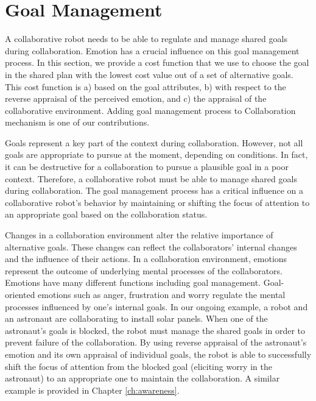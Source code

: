 \documentclass[12pt]{report}
\begin{document}
\section{Goal Management}
\label{sec:goal-management}

A collaborative robot needs to be able to regulate and manage shared goals
during collaboration. Emotion has a crucial influence on this goal management
process. In this section, we provide a cost function that we use to choose the
goal in the shared plan with the lowest cost value out of a set of alternative
goals. This cost function is a) based on the goal attributes, b) with respect to
the reverse appraisal of the perceived emotion, and c) the appraisal of the
collaborative environment. Adding goal management process to Collaboration
mechanism is one of our contributions.

Goals represent a key part of the context during collaboration. However, not all
goals are appropriate to pursue at the moment, depending on conditions. In fact,
it can be destructive for a collaboration to pursue a plausible goal in a poor
context. Therefore, a collaborative robot must be able to manage shared goals
during collaboration. The goal management process has a critical influence on a
collaborative robot's behavior by maintaining or shifting the focus of attention
to an appropriate goal based on the collaboration status.

Changes in a collaboration environment alter the relative importance of
alternative goals. These changes can reflect the collaborators' internal changes
and the influence of their actions. In a collaboration environment, emotions
represent the outcome of underlying mental processes of the collaborators.
Emotions have many different functions
\cite{scheutz:architectural-action-selection} including goal management.
Goal-oriented emotions such as anger, frustration and worry regulate the mental
processes influenced by one's internal goals. In our ongoing example, a robot
and an astronaut are collaborating to install solar panels. When one of the
astronaut's goals is blocked, the robot must manage the shared goals in order to
prevent failure of the collaboration. By using reverse appraisal
\cite{gratch:reverse-appraisal} of the astronaut's emotion and its own appraisal
of individual goals, the robot is able to successfully shift the focus of
attention from the blocked goal (eliciting worry in the astronaut) to an
appropriate one to maintain the collaboration. A similar example is provided in
Chapter \ref{ch:awareness}.
\end{document}
